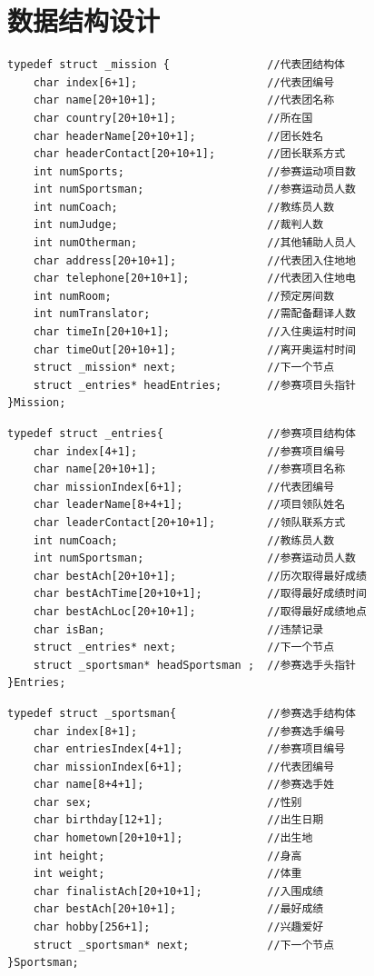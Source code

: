 \documentclass[10pt,a4paper]{article}
\begin{document}
\section{数据结构设计}
\begin{verbatim}
typedef struct _mission {               //代表团结构体
    char index[6+1];                    //代表团编号 
    char name[20+10+1];                 //代表团名称
    char country[20+10+1];              //所在国
    char headerName[20+10+1];           //团长姓名
    char headerContact[20+10+1];        //团长联系方式
    int numSports;                      //参赛运动项目数
    int numSportsman;                   //参赛运动员人数
    int numCoach;                       //教练员人数
    int numJudge;                       //裁判人数
    int numOtherman;                    //其他辅助人员人 
    char address[20+10+1];              //代表团入住地地 
    char telephone[20+10+1];            //代表团入住地电 
    int numRoom;                        //预定房间数
    int numTranslator;                  //需配备翻译人数
    char timeIn[20+10+1];               //入住奥运村时间
    char timeOut[20+10+1];              //离开奥运村时间
    struct _mission* next;              //下一个节点
    struct _entries* headEntries;       //参赛项目头指针
}Mission;
\end{verbatim}
\begin{verbatim}
typedef struct _entries{                //参赛项目结构体
    char index[4+1];                    //参赛项目编号
    char name[20+10+1];                 //参赛项目名称
    char missionIndex[6+1];             //代表团编号
    char leaderName[8+4+1];             //项目领队姓名
    char leaderContact[20+10+1];        //领队联系方式
    int numCoach;                       //教练员人数
    int numSportsman;                   //参赛运动员人数
    char bestAch[20+10+1];              //历次取得最好成绩
    char bestAchTime[20+10+1];          //取得最好成绩时间
    char bestAchLoc[20+10+1];           //取得最好成绩地点
    char isBan;                         //违禁记录        
    struct _entries* next;              //下一个节点      
    struct _sportsman* headSportsman ;  //参赛选手头指针
}Entries;
\end{verbatim}
\begin{verbatim}
typedef struct _sportsman{              //参赛选手结构体
    char index[8+1];                    //参赛选手编号
    char entriesIndex[4+1];             //参赛项目编号 
    char missionIndex[6+1];             //代表团编号
    char name[8+4+1];                   //参赛选手姓 
    char sex;                           //性别
    char birthday[12+1];                //出生日期
    char hometown[20+10+1];             //出生地
    int height;                         //身高
    int weight;                         //体重
    char finalistAch[20+10+1];          //入围成绩
    char bestAch[20+10+1];              //最好成绩
    char hobby[256+1];                  //兴趣爱好     
    struct _sportsman* next;            //下一个节点
}Sportsman;
\end{verbatim}
\end{document}
